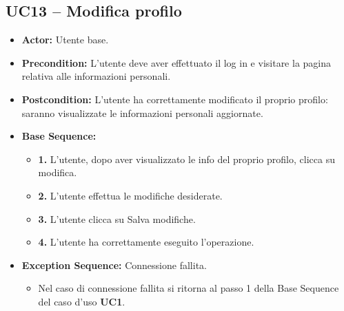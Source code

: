 \subsection{UC13 -- Modifica profilo}
\begin{itemize}
    \item \textbf{Actor:} Utente base.
    \item \textbf{Precondition:} L'utente deve aver effettuato il log in e visitare la pagina relativa alle informazioni personali.
    \item \textbf{Postcondition:} L'utente ha correttamente modificato il proprio profilo: saranno visualizzate le informazioni personali aggiornate.
    \item \textbf{Base Sequence:}
    \begin{itemize}
        \item \textbf{1.} L'utente, dopo aver visualizzato le info del proprio profilo, clicca su modifica.
        \item \textbf{2.} L'utente effettua le modifiche desiderate.
        \item \textbf{3.} L'utente clicca su Salva modifiche.
        \item \textbf{4.} L'utente ha correttamente eseguito l'operazione.
    \end{itemize}
    \item \textbf{Exception Sequence:} Connessione fallita.
    \begin{itemize}
        \item Nel caso di connessione fallita si ritorna al passo 1 della Base Sequence del caso d'uso \textbf{UC1}.
    \end{itemize}
\end{itemize}
\vspace{1cm}

